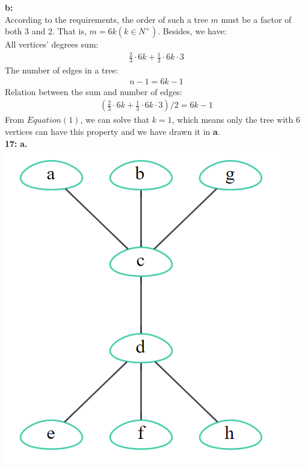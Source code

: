 \documentclass{article}
\begin{document}
\textbf{b:}\\
According to the requirements, the order of such a tree $m$ must be a factor of both 3 and 2. That is, $m=6k(k\in N^{+})$. Besides, we have:\\
All vertices' degrees sum:
\begin{equation*}
\begin{aligned}
\frac{2}{3}\cdot 6k+\frac{1}{3}\cdot 6k\cdot 3   
\end{aligned}
\end{equation*}
The number of edges in a tree:
\begin{equation*}
\begin{aligned}
n-1=6k-1
\end{aligned}	
\end{equation*}
Relation between the sum and number of edges:
\begin{equation}
\begin{aligned}
\left(\frac{2}{3}\cdot 6k+\frac{1}{3}\cdot 6k\cdot 3\right)/2=6k-1
\end{aligned}
\end{equation}
From $Equation(1)$, we can solve that $k=1$, which means only the tree with $6$ vertices can have this property and we have drawn it in \textbf{a}.\\
\textbf{17:}
\textbf{a.}\\
\includegraphics[scale=0.2]{17_2.png}
\end{document}
